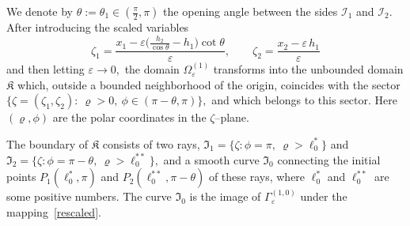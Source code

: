\documentclass[reqno]{amsart}            %
\numberwithin{equation}{section}
\begin{document}
	We denote by $\theta := \theta_1 \in(\frac{\pi}{2},\pi)$ the opening 
	angle between the sides $\mathcal I_1$ and $\mathcal I_2$.
	After introducing the scaled variables 
	\begin{equation}\label{rescaled}
		\zeta_1 = \frac{x_1 - \varepsilon\big(\frac{h_2}{\cos \theta} - h_1\big) \cot\theta}{\varepsilon}, \qquad
		\zeta_2 = \frac{x_2 - \varepsilon \, h_1}{\varepsilon}	
	\end{equation}
	and then letting $\varepsilon \to 0,$  the domain $\Omega_{\varepsilon}^{(1)}$ transforms into the unbounded domain $\mathfrak{K}$ which, outside a bounded neighborhood of the origin, coincides 
	with the sector
	$\{\zeta=(\zeta_1, \zeta_2)\colon \ \varrho > 0, \ \phi \in (\pi -\theta, \pi)\},$ and which belongs to this sector.
	Here $(\varrho,\phi)$ are the polar coordinates in the $\zeta$--plane.  
	
	
	The boundary of $\mathfrak{K}$ consists of two rays, $\mathfrak{I}_1 =\{\zeta\colon  \phi = \pi, \ \varrho > \ell_0^*\} $ and
	$\mathfrak{I}_2 =\{\zeta\colon  \phi = \pi -\theta, \ \varrho > \ell_0^{**}\},$
	and a smooth curve $\mathfrak{I}_0$ connecting the initial points $P_1(\ell_0^*, \pi)$ and $P_2(\ell_0^{**}, \pi - \theta)$  of these rays, where $\ell_0^*$ and $\ell_0^{**}$ are some positive numbers. The curve $\mathfrak{I}_0$ is the image of ${\Gamma_\varepsilon^{(1,0)}}$ under the mapping~\eqref{rescaled}.
	
\end{document}
